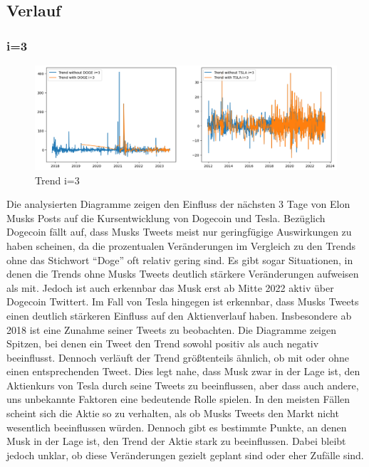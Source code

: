 \documentclass{article}
\begin{document}
\newpage



\subsection{Verlauf}
\subsubsection{i=3}
\begin{figure}[!htb]
  	\includegraphics[width=\textwidth, center]{../imgs/Trendi3.png}
 	\caption{Trend i=3}
 	\label{fig:Trendi3}
\end{figure}
Die analysierten Diagramme zeigen den Einfluss der nächsten 3 Tage von Elon Musks Posts auf die Kursentwicklung von Dogecoin und Tesla. Bezüglich Dogecoin fällt auf, dass Musks Tweets meist nur geringfügige Auswirkungen zu haben scheinen, da die prozentualen Veränderungen im Vergleich zu den Trends ohne das Stichwort ``Doge'' oft relativ gering sind. Es gibt sogar Situationen, in denen die Trends ohne Musks Tweets deutlich stärkere Veränderungen aufweisen als mit. Jedoch ist auch erkennbar das Musk erst ab Mitte 2022 aktiv über Dogecoin Twittert.
Im Fall von Tesla hingegen ist erkennbar, dass Musks Tweets einen deutlich stärkeren Einfluss auf den Aktienverlauf haben. Insbesondere ab 2018 ist eine Zunahme seiner Tweets zu beobachten. Die Diagramme zeigen Spitzen, bei denen ein Tweet den Trend sowohl positiv als auch negativ beeinflusst. Dennoch verläuft der Trend größtenteils ähnlich, ob mit oder ohne einen entsprechenden Tweet. Dies legt nahe, dass Musk zwar in der Lage ist, den Aktienkurs von Tesla durch seine Tweets zu beeinflussen, aber dass auch andere, uns unbekannte Faktoren eine bedeutende Rolle spielen.
In den meisten Fällen scheint sich die Aktie so zu verhalten, als ob Musks Tweets den Markt nicht wesentlich beeinflussen würden. Dennoch gibt es bestimmte Punkte, an denen Musk in der Lage ist, den Trend der Aktie stark zu beeinflussen. Dabei bleibt jedoch unklar, ob diese Veränderungen gezielt geplant sind oder eher Zufälle sind.
\end{document}
